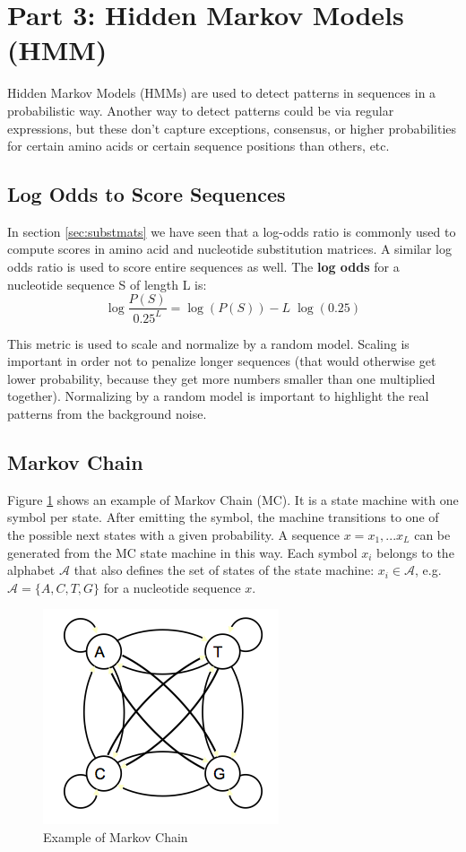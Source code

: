 \newpage

\section{Part 3: Hidden Markov Models (HMM)}

Hidden Markov Models (HMMs) are used to detect patterns in sequences in a probabilistic way. Another way to detect patterns could be via regular expressions, but these don't capture exceptions, consensus, or higher probabilities for certain amino acids or certain sequence positions than others, etc.

\subsection{Log Odds to Score Sequences}

In section \ref{sec:substmats} we have seen that a log-odds ratio is commonly used to compute scores in amino acid and nucleotide substitution matrices. A similar log odds ratio is used to score entire sequences as well. The {\bf log odds} for a nucleotide sequence S of length L is:
\begin{equation}
\log \frac{P(S)}{0.25^L} = \log(P(S)) - L \; \log(0.25)
\end{equation}

This metric is used to scale and normalize by a random model. Scaling is important in order not to penalize longer sequences (that would otherwise get lower probability, because they get more numbers smaller than one multiplied together). Normalizing by a random model is important to highlight the real patterns from the background noise.

\subsection{Markov Chain}

Figure \ref{fig:markovchain} shows an example of Markov Chain (MC). It is a state machine with one symbol per state. After emitting the symbol, the machine transitions to one of the possible next states with a given probability.
A sequence $x = x_1, ... x_L$ can be generated from the MC state machine in this way. Each symbol $x_i$ belongs to the alphabet $\mathcal{A}$ that also defines the set of states of the state machine: $x_i \in \mathcal{A}$, e.g. $\mathcal{A} = \{ A, C, T, G \}$ for a nucleotide sequence $x$.

\begin{figure}[!htb]
\centerline{\includegraphics[width=.3\linewidth]{figs/MarkovChain-example.png}}
\caption{Example of Markov Chain}\label{fig:markovchain}
\end{figure}

